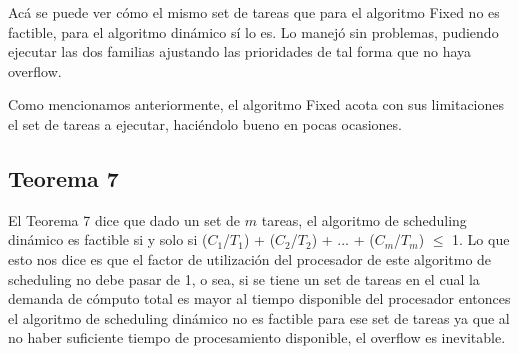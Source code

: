 Acá se puede ver cómo el mismo set de tareas que para el algoritmo Fixed no es factible, para el algoritmo dinámico sí lo es. Lo manejó sin problemas, pudiendo ejecutar las dos familias ajustando las prioridades de tal forma que no haya overflow.

Como mencionamos anteriormente, el algoritmo Fixed acota con sus limitaciones el set de tareas a ejecutar, haciéndolo bueno en pocas ocasiones.

\subsection{Teorema 7}
El Teorema 7 dice que dado un set de $m$ tareas, el algoritmo de scheduling dinámico es factible si y solo si ($C_1$/$T_1$) + ($C_2$/$T_2$) + ... + ($C_m$/$T_m$) $\le$ 1. Lo que esto nos dice es que el factor de utilización del procesador de este algoritmo de scheduling no debe pasar de 1, o sea, si se tiene un set de tareas en el cual la demanda de cómputo total es mayor al tiempo disponible del procesador entonces el algoritmo de scheduling dinámico no es factible para ese set de tareas ya que al no haber suficiente tiempo de procesamiento disponible, el overflow es inevitable.

